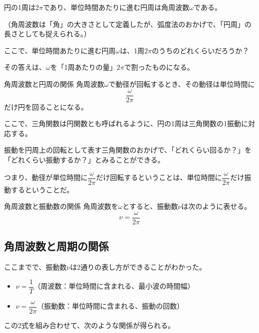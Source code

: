 \documentclass[../imaging-math]{subfiles}
\begin{document}
円の1周は$2\pi$であり、単位時間あたりに進む円周は角周波数$\omega$である。

\footnotesize
（角周波数は「角」の大きさとして定義したが、弧度法のおかげで、「円周」の長さとしても捉えられる。）
\normalsize

ここで、単位時間あたりに進む円周$\omega$は、1周$2\pi$のうちのどれくらいだろうか？

その答えは、$\omega$を「1周あたりの量」$2\pi$で割ったものになる。

\begin{theorem}{角周波数と円周の関係}
  \titlegap
  角周波数$\omega$で動径が回転するとき、その動径は単位時間に
  \LARGE
  \begin{equation}
    \dfrac{\omega}{2\pi}
  \end{equation}
  \normalsize
  だけ円を回ることになる。
\end{theorem}

ここで、三角関数は円関数とも呼ばれるように、円の1周は三角関数の1振動に対応する。

振動を円周上の回転として表す三角関数のおかげで、「どれくらい回るか？」を「どれくらい振動するか？」とみることができる。

つまり、動径が単位時間に$\dfrac{\omega}{2\pi}$だけ回転するということは、単位時間に$\dfrac{\omega}{2\pi}$だけ振動するということだ。

\begin{theorem}{角周波数と振動数の関係}
  \titlegap
  角周波数を$\omega$とすると、振動数$\nu$は次のように表せる。
  \LARGE
  \begin{equation}
    \nu = \dfrac{\omega}{2\pi}
  \end{equation}
  \normalsize
\end{theorem}

\subsection{角周波数と周期の関係}

ここまでで、振動数$\nu$は2通りの表し方ができることがわかった。

\begin{itemize}
  \item $\nu = \dfrac{1}{T}$（周波数：単位時間に含まれる、最小波の時間幅）
  \item $\nu = \dfrac{\omega}{2\pi}$（振動数：単位時間に含まれる、振動の回数）
\end{itemize}

この2式を組み合わせて、次のような関係が得られる。
\end{document}
